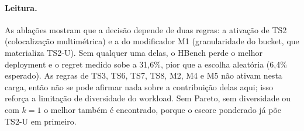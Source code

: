 \paragraph{Leitura.} As ablações mostram que a decisão depende de duas regras: a ativação de TS2 (colocalização multimétrica) e a do modificador M1 (granularidade do bucket, que materializa TS2-U). Sem qualquer uma delas, o HBench perde o melhor deployment e o regret medido sobe a 31,6\%, pior que a escolha aleatória (6,4\% esperado). As regras de TS3, TS6, TS7, TS8, M2, M4 e M5 não ativam nesta carga, então não se pode afirmar nada sobre a contribuição delas aqui; isso reforça a limitação de diversidade do workload. Sem Pareto, sem diversidade ou com $k=1$ o melhor também é encontrado, porque o escore ponderado já põe TS2-U em primeiro.
